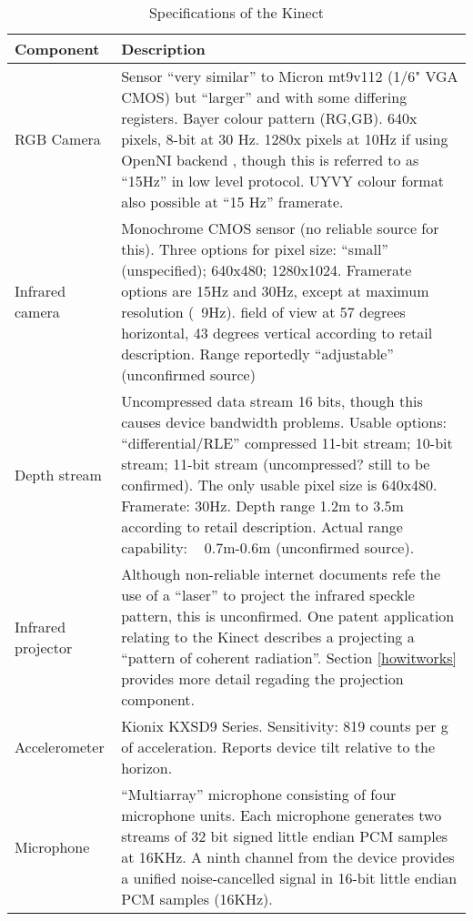 %
\begin{table}[ht]
\centering
\begin{tabular}{l p{10cm}}
\toprule
Component & Description \\
\midrule

RGB Camera & Sensor ``very similar'' to Mi\-cron mt9v112 (1/6" VGA CMOS) but
``larger'' and with some di\-ffering reg\-isters. Bay\-er co\-lour pa\-ttern (RG,GB).
640x\-480 pixels, 8-bit at 30 Hz.  1280x\-1024 pixels at 10\-Hz if using Open\-NI backend
, though this is referred to as ``15Hz'' in low level pro\-tocol. UYVY co\-lour
for\-mat also possible at ``15 Hz'' framerate.\cite{FREENECT}\cite{RGBDEMO} \\

Infrared camera & Monochrome CMOS sensor (no reliable source for this). Three
options for pixel size: ``small'' (unspecified); 640x480; 1280x1024. Framerate
options are 15Hz and 30Hz, except at maximum resolution (~9Hz).\cite{FREENECT}
field of view at 57 degrees horizontal, 43 degrees vertical according to retail
description.\cite{PLAY} Range reportedly ``adjustable'' (unconfirmed source) \\ 

Depth stream & Uncompressed data stream 16 bits, though this causes device
bandwidth problems. Usable options: ``differential/RLE'' compressed 11-bit
stream; 10-bit stream; 11-bit stream (uncompressed? still to be confirmed). The
only usable pixel size is 640x480. Framerate: 30Hz. \cite{FREENECT} Depth range
1.2m to 3.5m according to retail description.\cite{PLAY} Actual range
capability: ~ 0.7m-0.6m (unconfirmed source).\\

Infrared projector & Although non-reliable internet documents refe the use of a
``laser'' to project the infrared speckle pattern, this is unconfirmed. One
patent application relating to the Kinect describes a projecting a ``pattern of
coherent radiation''.\cite{SHPUNT:2010-1} Section \ref{howitworks} provides more
detail regading the projection component. \\

Accelerometer & Kionix KXSD9 Series. Sensitivity: 819 counts per g of
acceleration. Reports device tilt relative to the
horizon.\cite{FREENECT}\cite{KIONIX}\\

Microphone & ``Multiarray'' microphone consisting of four microphone units. Each
microphone generates two streams of 32 bit signed little endian PCM samples at
16KHz. A ninth channel from the device provides a unified noise-cancelled signal
in 16-bit little endian PCM samples (16KHz).\cite{FREENECT}\\

\bottomrule
\end{tabular}
\caption{Specifications of the Kinect}
\label{tab:specs}
\end{table}


